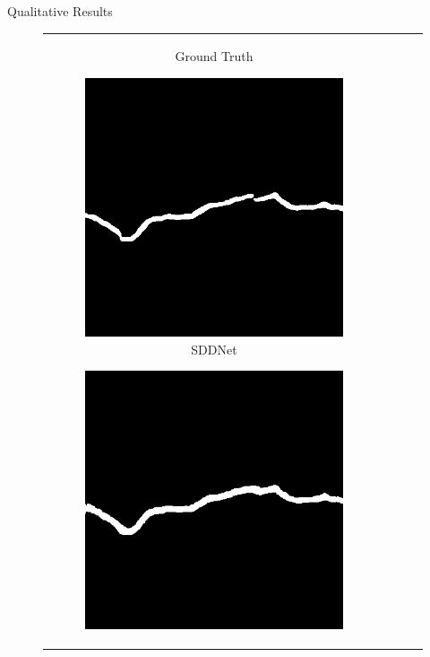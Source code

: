 \documentclass{lib/curtin_format}
\begin{document}
\begin{frame}{Qualitative Results}
\begin{figure}[htbp]
\begin{tabular}{cccc}
\begin{subfigure}[b]{0.23\textwidth}
                \caption{Ground Truth}
                \label{fig:crackseg-experiment-qualitative-ground-truth}
            \end{subfigure}
            \begin{subfigure}[b]{0.23\textwidth}
                \centering
                \includegraphics[width=\textwidth]{res/crackseg-experiment-qualitative/sddnet.png}
                \caption{SDDNet}
                \label{fig:crackseg-experiment-qualitative-sddnet}
            \end{subfigure}
            \begin{subfigure}[b]{0.23\textwidth}
                \centering
                \includegraphics[width=\textwidth]{res/crackseg-experiment-qualitative/unet.png}

\end{subfigure}
\end{tabular}
\end{figure}
\end{frame}
\end{document}
